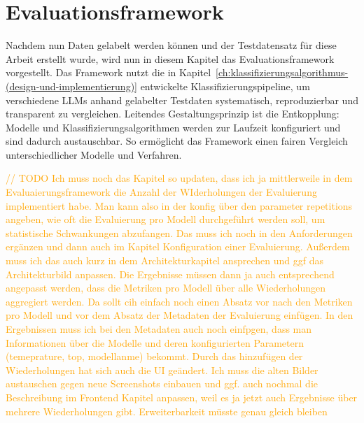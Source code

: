 
\chapter{Evaluationsframework}\label{ch:evaluationsframework}

Nachdem nun Daten gelabelt werden können und der Testdatensatz für diese Arbeit erstellt wurde, wird nun in diesem Kapitel das Evaluationsframework vorgestellt. Das Framework nutzt die in Kapitel~\ref{ch:klassifizierungsalgorithmus-(design-und-implementierung)} entwickelte Klassifizierungspipeline, um verschiedene \acp{LLM} anhand gelabelter Testdaten systematisch, reproduzierbar und transparent zu vergleichen. Leitendes Gestaltungsprinzip ist die Entkopplung: Modelle und Klassifizierungsalgorithmen werden zur Laufzeit konfiguriert und sind dadurch austauschbar. So ermöglicht das Framework einen fairen Vergleich unterschiedlicher Modelle und Verfahren.

\textcolor{orange}{// TODO Ich muss noch das Kapitel so updaten, dass ich ja mittlerweile in dem Evaluaierungsframework die Anzahl der WIderholungen der Evaluierung implementiert habe. Man kann also in der konfig über den parameter repetitions angeben, wie oft die Evaluierung pro Modell durchgeführt werden soll, um statistische Schwankungen abzufangen. Das muss ich noch in den Anforderungen ergänzen und dann auch im Kapitel Konfiguration einer Evaluierung. Außerdem muss ich das auch kurz in dem Architekturkapitel ansprechen und ggf das Architekturbild anpassen. Die Ergebnisse müssen dann ja auch entsprechend angepasst werden, dass die Metriken pro Modell über alle Wiederholungen aggregiert werden. Da sollt cih einfach noch einen Absatz vor nach den Metriken pro Modell und vor dem Absatz der Metadaten der Evaluierung einfügen. In den Ergebnissen muss ich bei den Metadaten auch noch einfpgen, dass man Informationen über die Modelle und deren konfigurierten Parametern (temeprature, top, modellanme) bekommt. Durch das hinzufügen der Wiederholungen hat sich auch die UI geändert. Ich muss die alten Bilder austauschen gegen neue Screenshots einbauen und ggf. auch nochmal die Beschreibung im Frontend Kapitel anpassen, weil es ja jetzt auch Ergebnisse über mehrere Wiederholungen gibt. Erweiterbarkeit müsste genau gleich bleiben}






